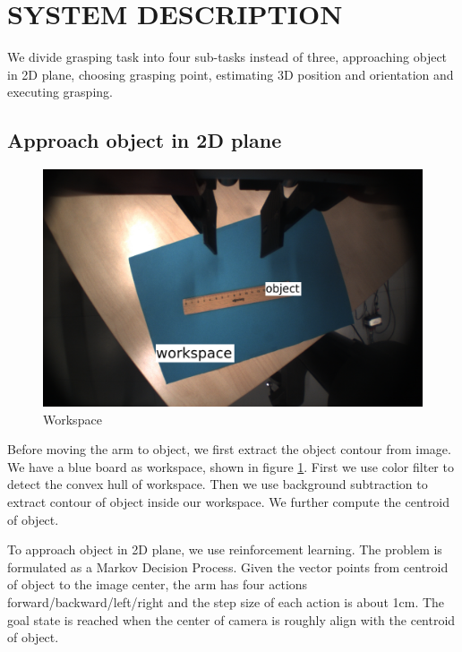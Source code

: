 \documentclass[a4paper, 10pt, conference]{ieeeconf}      %
\begin{document}
\section{SYSTEM DESCRIPTION}
 We divide grasping task into four sub-tasks instead of three, approaching object in 2D plane, choosing grasping point, estimating 3D position and orientation and executing grasping.
\subsection{Approach object in 2D plane}
\begin{figure}
	\centering
	\includegraphics[width=0.8\linewidth]{workspace}
	\caption{\label{fig:workspace}Workspace}
\end{figure}
Before moving the arm to object, we first extract the object contour from image. We have a blue board as workspace, shown in figure \ref{fig:workspace}. First we use color filter to detect the convex hull of workspace. Then we use background subtraction to extract contour of object inside our workspace. We further compute the centroid of object. 

To approach object in 2D plane, we use reinforcement learning. The problem is formulated as a Markov Decision Process. Given the vector points from centroid of object to the image center, the arm has four actions forward/backward/left/right and the step size of each action is about 1cm. The goal state is reached when the center of camera is roughly align with the centroid of object. 
\end{document}
